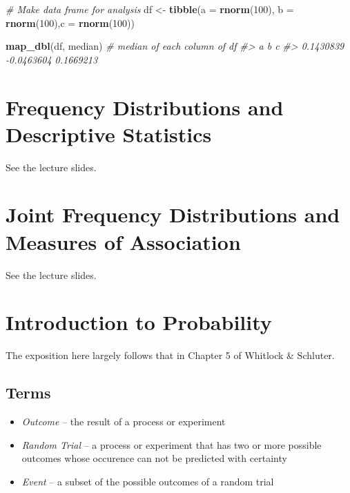 \documentclass[]{book}
\newenvironment{Shaded}{\begin{snugshade}}{\end{snugshade}}
\newcommand{\CommentTok}[1]{\textcolor[rgb]{0.56,0.35,0.01}{\textit{#1}}}
\newcommand{\DataTypeTok}[1]{\textcolor[rgb]{0.13,0.29,0.53}{#1}}
\newcommand{\DecValTok}[1]{\textcolor[rgb]{0.00,0.00,0.81}{#1}}
\newcommand{\KeywordTok}[1]{\textcolor[rgb]{0.13,0.29,0.53}{\textbf{#1}}}
\newcommand{\NormalTok}[1]{#1}
\newcommand{\StringTok}[1]{\textcolor[rgb]{0.31,0.60,0.02}{#1}}
\theoremstyle{definition}
\theoremstyle{definition}
\theoremstyle{definition}
\theoremstyle{remark}
\begin{document}
\begin{Shaded}
\begin{Highlighting}[]
\CommentTok{# Make data frame for analysis}
\NormalTok{df <-}\StringTok{ }\KeywordTok{tibble}\NormalTok{(}\DataTypeTok{a =} \KeywordTok{rnorm}\NormalTok{(}\DecValTok{100}\NormalTok{), }\DataTypeTok{b =} \KeywordTok{rnorm}\NormalTok{(}\DecValTok{100}\NormalTok{),}\DataTypeTok{c =} \KeywordTok{rnorm}\NormalTok{(}\DecValTok{100}\NormalTok{))}

\KeywordTok{map_dbl}\NormalTok{(df, median) }\CommentTok{# median of each column of df}
\CommentTok{#>          a          b          c }
\CommentTok{#>  0.1430839 -0.0463604  0.1669213}
\end{Highlighting}
\end{Shaded}

\hypertarget{frequency-distributions-and-descriptive-statistics}{%
\chapter{Frequency Distributions and Descriptive
Statistics}\label{frequency-distributions-and-descriptive-statistics}}

See the lecture slides.

\hypertarget{joint-frequency-distributions-and-measures-of-association}{%
\chapter{Joint Frequency Distributions and Measures of
Association}\label{joint-frequency-distributions-and-measures-of-association}}

See the lecture slides.

\hypertarget{introduction-to-probability}{%
\chapter{Introduction to
Probability}\label{introduction-to-probability}}

The exposition here largely follows that in Chapter 5 of Whitlock \&
Schluter.

\hypertarget{terms}{%
\section{Terms}\label{terms}}

\begin{itemize}
\item
  \emph{Outcome} -- the result of a process or experiment
\item
  \emph{Random Trial} -- a process or experiment that has two or more
  possible outcomes whose occurence can not be predicted with certainty
\item
  \emph{Event} -- a subset of the possible outcomes of a random trial
\end{itemize}
\end{document}
